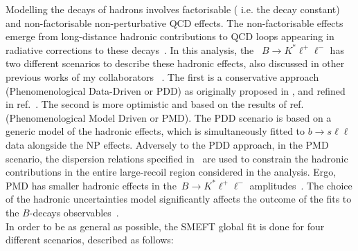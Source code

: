 Modelling the decays of hadrons involves factorisable ( i.e. the decay constant) and non-factorisable non-perturbative QCD effects. The non-factorisable effects emerge from long-distance hadronic contributions to QCD loops appearing in radiative corrections to these decays~\cite{Khodjamirian:2010vf,Jager:2014rwa,Lyon:2014hpa}. In this analysis, the ~$B\to K^*\ell^+\ell^-$ has two different scenarios to describe these hadronic effects, also discussed in other previous works of my collaborators ~\cite{Ciuchini:2016weo,Ciuchini:2017mik,Ciuchini:2017gva,Ciuchini:2018xll,Ciuchini:2018anp, Ciuchini:2019usw}. The first is a conservative approach (Phenomenological Data-Driven or PDD) as originally proposed in \cite{Ciuchini:2015qxb}, and refined in ref.~\cite{Ciuchini:2018anp}. The second is  more optimistic and  based on the results of ref.~\cite{Khodjamirian:2010vf} (Phenomenological Model Driven or PMD). The PDD scenario is based on a generic model of the hadronic effects, which is simultaneously fitted to $b \to s \ell \ell$ data alongside the NP effects. Adversely to the PDD approach, in the PMD scenario, the dispersion relations specified in~\cite{Khodjamirian:2010vf} are used to constrain the hadronic contributions in the entire large-recoil region considered in the analysis. Ergo, PMD has smaller hadronic effects in the~$B\to K^*\ell^+\ell^-$ amplitudes~\cite{Ciuchini:2016weo}. The choice of the hadronic uncertainties model significantly affects the outcome of the fits to the $B$-decays observables~\cite{Ciuchini:2019usw}. \\ In order to be as general as possible, the SMEFT global fit is done for four different scenarios, described as follows:
